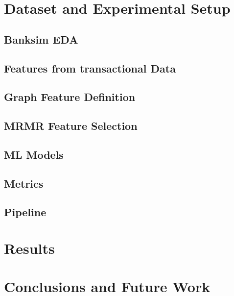 \documentclass{article}
\begin{document}
\section{Dataset and Experimental Setup}
\subsection*{Banksim EDA}
\subsection*{Features from transactional Data}
\subsection*{Graph Feature Definition}
\subsection*{MRMR Feature Selection}
\subsection*{ML Models}
\subsection*{Metrics}
\subsection*{Pipeline}
\section{Results}

\section{Conclusions and Future Work}




\end{document}
